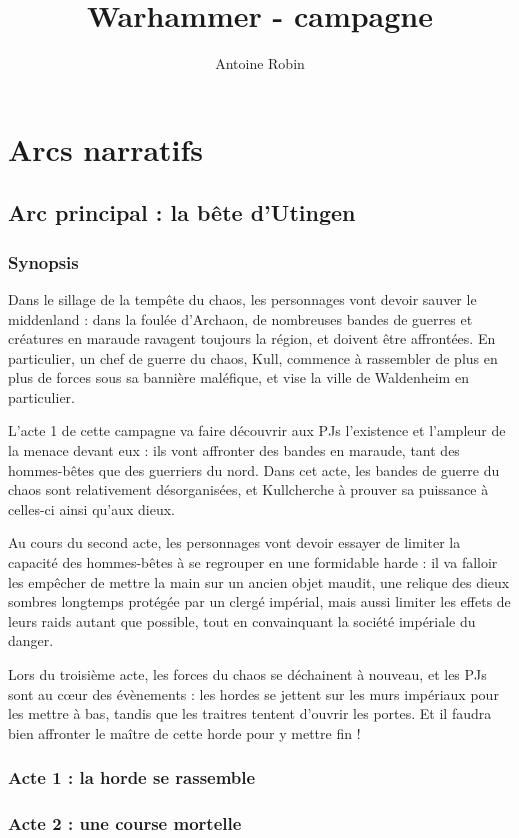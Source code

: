 \documentclass[10pt,a4paper]{book}
\author{ Antoine Robin}
\title{Warhammer - campagne}
\begin{document}
\chapter{Arcs narratifs}
\section{Arc principal : la bête d'Utingen}
\subsection{Synopsis}
\newcommand{\nomadversaire}{Kull}
Dans le sillage de la tempête du chaos, les personnages vont devoir sauver le middenland : dans la foulée d'Archaon, de nombreuses bandes de guerres et créatures en maraude ravagent toujours la région, et doivent être affrontées. En particulier, un chef de guerre du chaos, \nomadversaire, commence à rassembler de plus en plus de forces sous sa bannière maléfique, et vise la ville de Waldenheim en particulier.


L'acte 1 de cette campagne va faire découvrir aux PJs l'existence et l'ampleur de la menace devant eux : ils vont affronter des bandes en maraude, tant des hommes-bêtes que des guerriers du nord. Dans cet acte, les bandes de guerre du chaos sont relativement désorganisées, et \nomadversaire cherche à prouver sa puissance à celles-ci ainsi qu'aux dieux.

Au cours du second acte, les personnages vont devoir essayer de limiter la capacité des hommes-bêtes à se regrouper en une formidable harde : il va falloir les empêcher de mettre la main sur un ancien objet maudit, une relique des dieux sombres longtemps protégée par un clergé impérial, mais aussi limiter les effets de leurs raids autant que possible, tout en convainquant la société impériale du danger.

Lors du troisième acte, les forces du chaos se déchainent à nouveau, et les PJs sont au cœur des évènements : les hordes se jettent sur les murs impériaux pour les mettre à bas, tandis que les traitres tentent d'ouvrir les portes. Et il faudra bien affronter le maître de cette horde pour y mettre fin !
\subsection{Acte 1 : la horde se rassemble}
\subsection{Acte 2 : une course mortelle}
\end{document}
